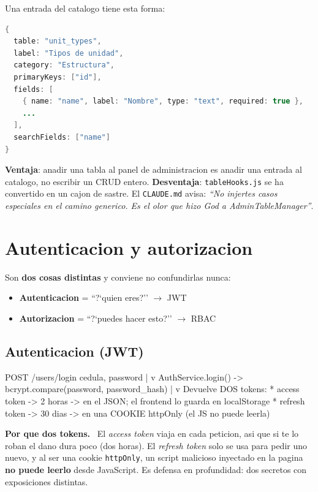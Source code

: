 \documentclass[11pt,a4paper,oneside]{report}
\newenvironment{concepto}[1][Concepto para juniors]{%
  \par\medskip
  \colorlet{shadecolor}{blue!7}%
  \begin{shaded}\noindent\textbf{\color{blue!55!black}#1.}\ \ignorespaces}%
  {\end{shaded}\par\medskip}
\newcommand{\rt}[1]{\texttt{#1}}
\begin{document}
Una entrada del catalogo tiene esta forma:

\begin{lstlisting}[language=Java]
{
  table: "unit_types",
  label: "Tipos de unidad",
  category: "Estructura",
  primaryKeys: ["id"],
  fields: [
    { name: "name", label: "Nombre", type: "text", required: true },
    ...
  ],
  searchFields: ["name"]
}
\end{lstlisting}

\textbf{Ventaja}: anadir una tabla al panel de administracion es anadir una entrada al
catalogo, no escribir un CRUD entero. \textbf{Desventaja}: \rt{tableHooks.js} se ha convertido
en un cajon de sastre. El \rt{CLAUDE.md} avisa: \emph{``No injertes casos especiales en el
camino generico. Es el olor que hizo God a AdminTableManager''}.

\section{Autenticacion y autorizacion}

Son \textbf{dos cosas distintas} y conviene no confundirlas nunca:

\begin{itemize}[leftmargin=1.4em]
  \item \textbf{Autenticacion} = ``?`quien eres?'' $\rightarrow$ JWT
  \item \textbf{Autorizacion} = ``?`puedes hacer esto?'' $\rightarrow$ RBAC
\end{itemize}

\subsection{Autenticacion (JWT)}

\begin{diagrama}
POST /users/login  { cedula, password }
   |
   v
AuthService.login()  ->  bcrypt.compare(password, password_hash)
   |
   v
Devuelve DOS tokens:
   * access token   -> 2 horas   -> en el JSON; el frontend lo guarda en localStorage
   * refresh token  -> 30 dias   -> en una COOKIE httpOnly (el JS no puede leerla)
\end{diagrama}

\begin{concepto}[Por que dos tokens]
El \emph{access token} viaja en cada peticion, asi que si te lo roban el dano dura poco (dos
horas). El \emph{refresh token} solo se usa para pedir uno nuevo, y al ser una cookie
\rt{httpOnly}, un script malicioso inyectado en la pagina \textbf{no puede leerlo} desde
JavaScript. Es defensa en profundidad: dos secretos con exposiciones distintas.
\end{concepto}
\end{document}
